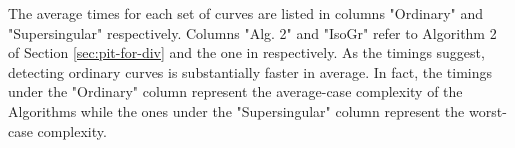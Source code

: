 \documentclass[12pt]{article}
\theoremstyle{plain}
\theoremstyle{definition}
\begin{document}
The average times for each set of curves are listed in columns "Ordinary" and "Supersingular" 
respectively. Columns "Alg. 2" and "IsoGr" refer to Algorithm 2 of Section \ref{sec:pit-for-div} 
and the one in \cite{sutherland2012} respectively. As the timings suggest, detecting ordinary 
curves is substantially faster in average. In fact, the timings under the "Ordinary" column 
represent the average-case complexity of the Algorithms while the ones under the "Supersingular" 
column represent the worst-case complexity.






\end{document}
